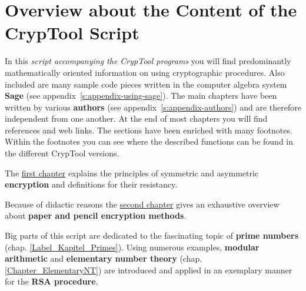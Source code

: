
\makeatletter \renewcommand{\thepage}{~\csname @roman\endcsname \c@page~} \makeatother
\clearpage{}
\makeatletter \renewcommand{\thepage}{\csname @roman\endcsname \c@page} \makeatother
{}
\chapter*{Overview about the Content of the CrypTool Script}  

\parskip 4pt
\noindent In this {\em script accompanying the CrypTool programs} 
you will find predominantly mathematically oriented information on using
cryptographic procedures. Also included are many sample code pieces written in the
computer algebra system {\bf Sage} (see appendix~\ref{s:appendix-using-sage}).
The main chapters have been written by various {\bf authors}
(see appendix~\ref{s:appendix-authors}) %
and are therefore independent from one another. At the end of most chapters
you will find references and web links.
The sections have been enriched with many footnotes. Within the footnotes you can see
where the described functions can be found in the different CrypTool versions.

The \hyperlink{Kapitel_1}{first chapter} explains the principles of symmetric
and asymmetric {\bf encryption} and definitions for their resistancy.

Because of didactic reasons the \hyperlink{Kapitel_PaperandPencil}
{second chapter} gives an exhaustive overview
about {\bf paper and pencil encryption methods}.

Big parts of this script are dedicated to the fascinating topic of 
{\bf prime numbers} (chap. \ref{Label_Kapitel_Primes}).
Using numerous examples,
{\bf modular arithmetic} and 
{\bf elementary number theory} (chap. \ref{Chapter_ElementaryNT})
are introduced and applied in an exemplary manner for the {\bf RSA procedure}.

